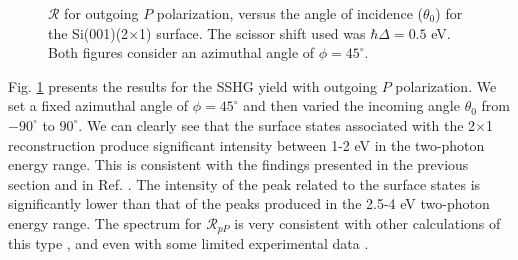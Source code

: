 \begin{figure}[b]
\centering
{}\hfill
{}
\caption[Overview of the angular dependence of $\mathcal{R}_{\mathrm{iP}}$.]
{$\mathcal{R}$ for outgoing $P$ polarization, versus the angle of
incidence ($\theta_{0}$) for the Si(001)(2$\times$1) surface. The scissor shift
used was $\hbar\Delta = 0.5$ eV. Both figures consider an azimuthal angle of
$\phi = 45^{\circ}$.}
\label{fig:2x1rP3d}
\end{figure}

Fig. \ref{fig:2x1rP3d} presents the results for the SSHG yield with outgoing $P$
polarization. We set a fixed azimuthal angle of $\phi = 45^{\circ}$ and then
varied the incoming angle $\theta_{0}$ from $-90^{\circ}$ to $90^{\circ}$. We
can clearly see that the surface states associated with the 2$\times$1
reconstruction produce significant intensity between 1-2 eV in the two-photon
energy range. This is consistent with the findings presented in the previous
section and in Ref. \cite{andersonPRB15}. The intensity of the peak related to
the surface states is significantly lower than that of the peaks produced in the
2.5-4 eV two-photon energy range. The spectrum for $\mathcal{R}_{pP}$ is very
consistent with other calculations of this type
\cite{tancognedejean:tel-01235611}, and even with some limited experimental data
\cite{powerPRL95}.


